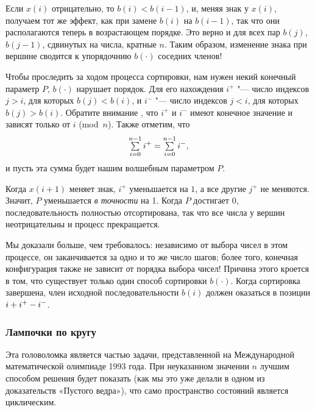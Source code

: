 \documentclass[twoside]{book}
\begin{document}
Если $x(i)$ отрицательно, то $b(i) < b(i-1)$, и, меняя знак у $x(i)$, получаем тот же эффект, как при замене $b(i)$ на $b(i - 1)$, так что они располагаются теперь в возрастающем порядке.
Это верно и для всех пар $b(j)$, $b(j - 1)$, сдвинутых на числа, кратные $n$.
Таким образом, изменение знака при вершине сводится к упорядочнию $b(\cdot)$ соседних членов!

Чтобы проследить за ходом процесса сортировки, нам нужен некий конечный параметр $P$,  $b(\cdot)$ нарушает порядок. %
Для его нахождения  $i^+$ "--- число индексов $j > i$, для которых $b(j) < b(i)$, и $i^-$ "--- число индексов $j < i$, для которых $b(j) > b(i)$.
Обратите внимание , что $i^+$ и $i^-$ имеют конечное значение и зависят только от $i$ (mod~$n$).
Также отметим, что 
\[ \mathop{\textstyle\sum}\limits_{i=0}^{n-1}i^+= \mathop{\textstyle\sum}\limits_{i=0}^{n-1}i^-   ,
\]
и пусть эта сумма будет нашим волшебным параметром $P$.

Когда $x(i+1)$ меняет знак, $i^+$ уменьшается на $1$, а все другие $j^+$ не меняются.
Значит, $P$ уменьшается \emph{в точности} на 1.
Когда $P$ достигает $0$, последовательность полностью отсортирована, так что все числа у вершин неотрицательны и процесс прекращается.

Мы доказали больше, чем требовалось:
независимо от выбора чисел в этом процессе, он заканчивается за одно и то же  число шагов;
более того, конечная конфигурация также не зависит от порядка выбора чисел!
Причина этого кроется в том, что существует только один способ сортировки $b(\cdot)$.
Когда сортировка завершена, член исходной последовательности $b(i)$ должен оказаться в позиции $i \z+ i^+ - i^-$.
\heart

\subsubsection*{Лампочки по кругу}%

Эта головоломка является частью задачи, представленной на Международной математической олимпиаде 1993 года.
При неуказанном значении $n$ лучшим способом решения будет показать (как мы это уже делали в одном из доказательств «Пустого ведра»), что само пространство состояний является циклическим.

\end{document}
